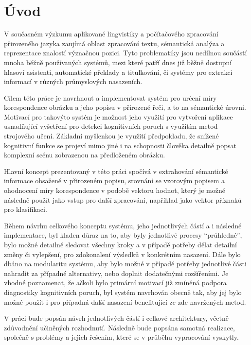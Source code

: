 \clearpage
\section{Úvod}
V současném výzkumu aplikované lingvistiky a počítačového zpracování přirozeného
jazyka zaujímá oblast zpracování textu, sémantická analýza a reprezentace znalostí význačnou pozici.
Tyto problematiky jsou nedílnou součástí mnoha běžně používaných systémů,
mezi které patří dnes již běžně dostupní hlasoví asistenti, automatické překlady a titulkování,
či systémy pro extrakci informací v různých průmyslových nasazeních.

Cílem této práce je navrhnout a implementovat systém pro určení míry korespondence obrázku a jeho popisu v přirozené řeči, a to na sémantické úrovni.
Motivací pro takovýto systém je možnost jeho využití pro vytvoření aplikace usnadňující vyšetření pro detekci kognitivních
poruch s využitím metod strojového učení.
Základní myšlenkou je využití předpokladu, že snížené kognitivní funkce se projeví mimo jiné
i na schopnosti člověka detailně popsat komplexní scénu zobrazenou na předloženém obrázku.

Hlavní koncept prezentovaný v této práci spočívá v extrahování sémantické informace obsažené v přirozeném popisu,
srovnání se vzorovým popisem a ohodnocení míry korespondence v podobě vektoru hodnot, který je možné
následně použít jako vstup pro další zpracování, například jako vektor příznaků pro klasifikaci.

Během návrhu celkového konceptu systému, jeho jednotlivých částí a i následné implementace, byl kladen důraz na to,
aby byly jednotlivé procesy \enquote{průhledné}, bylo možné detailně sledovat všechny kroky
a v případě potřeby dělat detailní změny či vylepšení, pro zdokonalení výsledků v konkrétním nasazení.
Dále bylo dbáno na modularitu systému, aby bylo možné v případě potřeby jednotlivé části nahradit za případné alternativy,
nebo doplnit dodatečnými rozšířeními.
Je vhodné poznamenat, že ačkoli bylo primární motivací již zmíněná podpora diagnostiky kognitivních poruch,
byl systém navrhován obecně tak, aby jej bylo možné použít i pro případná další nasazení benefitující ze zde navržených metod.

V práci bude popsán návrh jednotlivých částí i celkové architektury, včetně zdůvodnění učiněných rozhodnutí.
Následně bude popsána samotná realizace, společně s problémy a jejich řešením, které se v průběhu vypracování vyskytly.
